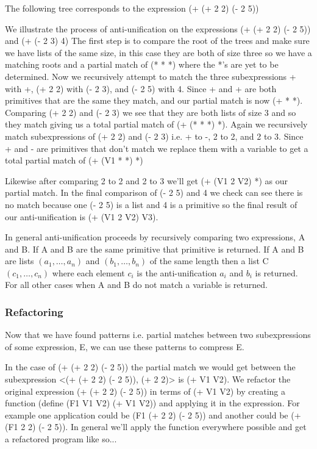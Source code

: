 \documentclass[a4paper,10pt]{article}
\begin{document}
The following tree corresponds to the expression (+ (+ 2 2) (- 2 5)) 

We illustrate the process of anti-unification on the expressions (+ (+ 2 2) (- 2 5)) and (+ (- 2 3) 4)
The first step is to compare the root of the trees and make sure we have lists of the same size, in this case they are both of size three so we have a matching roots and a partial match of (* * *) where the *'s are yet to be determined.
Now we recursively attempt to match the three subexpressions + with +, (+ 2 2) with (- 2 3), and (- 2 5) with 4.
Since + and + are both primitives that are the same they match, and our partial match is now (+ * *).
Comparing (+ 2 2) and (- 2 3) we see that they are both lists of size 3 and so they match giving us a total partial match of (+ (* * *) *).
Again we recursively match subexpressions of (+ 2 2) and (- 2 3) i.e. + to -, 2 to 2, and 2 to 3.
Since + and - are primitives that don't match we replace them with a variable to get a total partial match of (+ (V1 * *) *)

Likewise after comparing 2 to 2 and 2 to 3 we'll get (+ (V1 2 V2) *) as our partial match.
In the final comparison of (- 2 5) and 4 we check can see there is no match because one (- 2 5) is a list and 4 is a primitive so the final result of our anti-unification is (+ (V1 2 V2) V3).

In general anti-unification proceeds by recursively comparing two expressions, A and B.  If A and B are the same primitive that primitive is returned.  If A and B are lists $(a_1,\ldots,a_n)$ and $(b_1,\ldots,b_n)$ of the same length then a list C $(c_1,\ldots,c_n)$ where each element $c_i$ is the anti-unification $a_i$ and $b_i$ is returned.  For all other cases when A and B do not match a variable is returned.
\subsubsection{Refactoring}
Now that we have found patterns i.e. partial matches between two subexpressions of some expression, E, we can use these patterns to compress E.

In the case of (+ (+ 2 2) (- 2 5)) the partial match we would get between the subexpression <(+ (+ 2 2) (- 2 5)), (+ 2 2)> is (+ V1 V2).  We refactor the original expression (+ (+ 2 2) (- 2 5)) in terms of (+ V1 V2) by creating a function (define (F1 V1 V2) (+ V1 V2)) and applying it in the expression.  For example one application could be (F1 (+ 2 2) (- 2 5)) and another could be (+ (F1 2 2) (- 2 5)).  In general we'll apply the function everywhere possible and get a refactored program like so...
\end{document}
